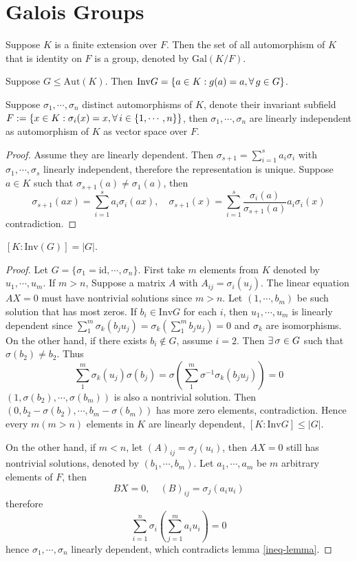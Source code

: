 \section{Galois Groups}
\begin{definition}
    Suppose $K$ is a finite extension over $F$. Then the set of all automorphism of $K$ that is identity on $F$ is a group, denoted by $\mathrm{Gal}(K/F)$.
\end{definition}
\begin{definition}
    Suppose $G\le\mathrm{Aut}(K)$. Then $\mathrm{Inv}G=\{a\in K:g(a)=a,\forall\, g\in G\}$.
\end{definition}
\begin{lemma}\label{ineq-lemma}
    Suppose $\sigma_1,\cdots,\sigma_n$ distinct automorphisms of $K$, denote their invariant subfield $F:=\{x\in K:\sigma_i(x)=x,\forall\, i\in\{1,\cdots,n\}\}$, then $\sigma_1,\cdots,\sigma_n$ are linearly independent as automorphism of $K$ as vector space over $F$.
\end{lemma}
\begin{proof}
    Assume they are linearly dependent. Then $\sigma_{s+1}=\sum_{i=1}^sa_i\sigma_i$ with $\sigma_1,\cdots,\sigma_s$ linearly independent, therefore the representation is unique. Suppose $a\in K$ such that $\sigma_{s+1}(a)\neq\sigma_1(a)$, then
    $$
    \sigma_{s+1}(ax)=\sum_{i=1}^sa_i\sigma_i(ax),\quad \sigma_{s+1}(x)=\sum_{i=1}^s\dfrac{\sigma_i(a)}{\sigma_{s+1}(a)}a_i\sigma_i(x)
    $$
    contradiction.
\end{proof}
\begin{proposition}\label{1st-inequality}
    $[K:\mathrm{Inv}(G)]=|G|$.
\end{proposition}
\begin{proof}
    Let $G=\{\sigma_1=\mathrm{id},\cdots,\sigma_{n}\}$. First take $m$ elements from $K$ denoted by $u_1,\cdots,u_m$. If $m>n$, Suppose a matrix $A$ with $A_{ij}=\sigma_i(u_j)$. The linear equation $AX=0$ must have nontrivial solutions since $m>n$. Let $(1,\cdots ,b_m)$ be such solution that has most zeros. If $b_i\in\mathrm{Inv}G$ for each $i$, then $u_1,\cdots,u_m$ is linearly dependent since $\sum^m_1\sigma_k(b_ju_j)=\sigma_k(\sum^m_1b_ju_j)=0$ and $\sigma_k$ are isomorphisms. On the other hand, if there exists $b_i\not\in G$, assume $i=2$. Then $\exists\, \sigma\in G$ such that $\sigma(b_2)\neq b_2$. Thus
    $$
    \sum^m_1\sigma_k(u_j)\sigma(b_j)=\sigma\left(\sum^m_1\sigma^{-1}\sigma_k(b_ju_j)\right)=0
    $$
    $(1,\sigma(b_2),\cdots,\sigma(b_m))$ is also a nontrivial solution. Then $(0,b_2-\sigma(b_2),\cdots,b_m-\sigma(b_m))$ has more zero elements, contradiction. Hence every $m(m>n)$ elements in $K$ are linearly dependent, $[K:\mathrm{Inv}G]\le|G|$.
    \par On the other hand, if $m<n$, let $(A)_{ij}=\sigma_j(u_i)$, then $AX=0$ still has nontrivial solutions, denoted by $(b_1,\cdots,b_m)$. Let $a_1,\cdots,a_m$ be $m$ arbitrary elements of $F$, then
    $$
    BX=0,\quad (B)_{ij}=\sigma_j(a_iu_i)
    $$
    therefore
    $$
    \sum_{i=1}^n\sigma_i(\sum^{m}_{j=1}a_iu_i)=0
    $$
    hence $\sigma_1,\cdots,\sigma_n$ linearly dependent, which contradicts lemma \ref{ineq-lemma}.
\end{proof}
